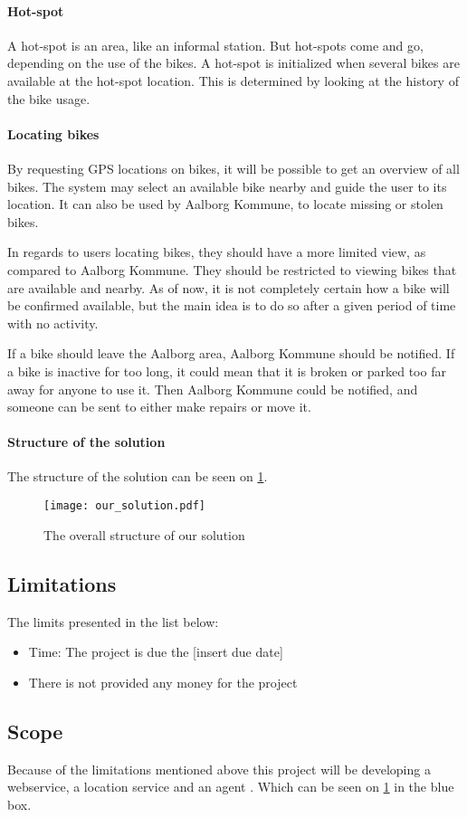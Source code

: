 \paragraph{Hot-spot}
A hot-spot is an area, like an informal station.
But hot-spots come and go, depending on the use of the bikes.
A hot-spot is initialized when several bikes are available at the hot-spot location.
This is determined by looking at the history of the bike usage.

\paragraph{Locating bikes}
By requesting GPS locations on bikes, it will be possible to get an overview of all bikes.
The system may select an available bike nearby and guide the user to its location.
It can also be used by Aalborg Kommune, to locate missing or stolen bikes.

In regards to users locating bikes, they should have a more limited view, as compared to Aalborg Kommune.
They should be restricted to viewing bikes that are available and nearby.
As of now, it is not completely certain how a bike will be confirmed available, but the main idea is to do so after a given period of time with no activity.

If a bike should leave the Aalborg area, Aalborg Kommune should be notified.
If a bike is inactive for too long, it could mean that it is broken or parked too far away for anyone to use it.
Then Aalborg Kommune could be notified, and someone can be sent to either make repairs or move it.

\paragraph{Structure of the solution}
The structure of the solution can be seen on \cref{fig:solution_structure}.

\begin{figure}
\texttt{[image: our\_solution.pdf]}
\caption{The overall structure of our solution}
\label{fig:solution_structure}
\end{figure}

\subsection{Limitations}
The limits presented in the list below:
\begin{itemize}
\item Time: The project is due the [insert due date]
\item There is not provided any money for the project
\end{itemize}

\subsection{Scope}
Because of the limitations mentioned above this project will be developing a webservice, a location service and an agent .
Which can be seen on \cref{fig:solution_structure} in the blue box.
